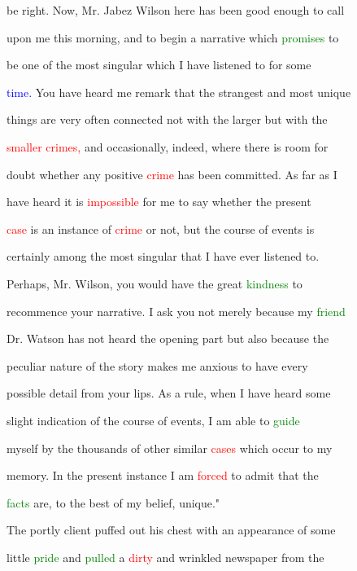  be right. Now, Mr. Jabez Wilson here has been \textcolor{BurntOrange}{good} enough to call

 upon me this morning, and to begin a narrative which \textcolor{green}{promises} to

 be one of the most singular which I have listened to for some

 \textcolor{blue}{time.} You have heard me remark that the strangest and most \textcolor{BurntOrange}{unique}

 things are very often connected not with the larger but with the

 \textcolor{red}{smaller} \textcolor{red}{crimes,} and occasionally, indeed, where there is room for

 \textcolor{BurntOrange}{doubt} whether any positive \textcolor{red}{crime} has been committed. As far as I

 have heard it is \textcolor{red}{impossible} for me to say whether the \textcolor{BurntOrange}{present}

 \textcolor{red}{case} is an instance of \textcolor{red}{crime} or not, but the course of events is

 certainly among the most singular that I have ever listened to.

 Perhaps, Mr. Wilson, you would have the great \textcolor{green}{kindness} to

 recommence your narrative. I ask you not merely because my \textcolor{green}{friend}

 Dr. Watson has not heard the opening part but also because the

 peculiar nature of the story makes me \textcolor{BurntOrange}{anxious} to have every

 possible detail from your lips. As a \textcolor{BurntOrange}{rule,} when I have heard some

 slight indication of the course of events, I am able to \textcolor{green}{guide}

 myself by the thousands of other similar \textcolor{red}{cases} which occur to my

 memory. In the \textcolor{BurntOrange}{present} instance I am \textcolor{red}{forced} to admit that the

 \textcolor{green}{facts} are, to the best of my belief, \textcolor{BurntOrange}{unique."}



 The portly client puffed out his chest with an appearance of some

 little \textcolor{green}{pride} and \textcolor{green}{pulled} a \textcolor{red}{dirty} and wrinkled newspaper from the

